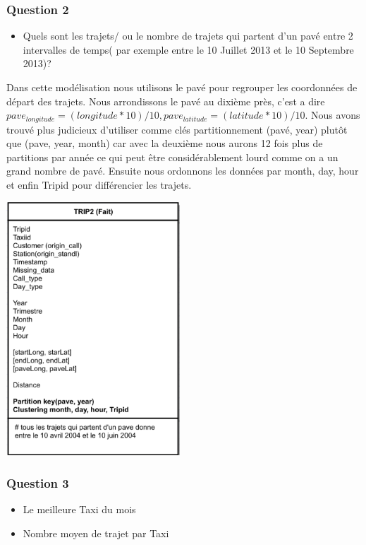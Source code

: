 \documentclass[]{report}
\begin{document}
	
	\subsubsection{Question 2}
	\begin{itemize}
		\item Quels sont les trajets/ ou le nombre de trajets qui partent d'un pavé entre 2 intervalles de temps( par exemple entre le 10 Juillet 2013 et le 10 Septembre 2013)?
	\end{itemize}
	Dans cette modélisation nous utilisons le pavé pour regrouper les coordonnées de départ des trajets. Nous arrondissons le pavé au dixième près, c'est a dire $pave_{longitude} = (longitude*10)/10, pave_{latitude} = (latitude*10)/10$. Nous avons trouvé plus judicieux d'utiliser comme clés partitionnement (pavé, year) plutôt que (pave, year, month) car avec la deuxième nous aurons 12 fois plus de partitions par année ce qui peut être considérablement lourd comme on a un grand nombre de pavé. Ensuite nous ordonnons les données par month, day, hour et enfin Tripid pour différencier les trajets. 
	
	
	\begin{center}
		\includegraphics[width=65mm]{Figures/Trip2.png}
		\label{fig:y=6}
	\end{center}
	\subsubsection{Question 3}
	\begin{itemize}
		\item Le meilleure Taxi du mois 
		\item  Nombre moyen de trajet par Taxi
	\end{itemize}
	
\end{document}
